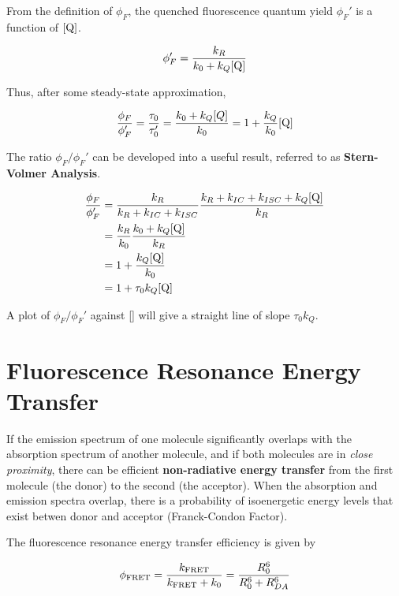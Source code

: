 \documentclass[a4paper]{tufte-handout}
\theoremstyle{definition}
\begin{document}
From the definition of $\phi_F$, the quenched fluorescence quantum yield $\phi_F'$ is a function of $[\ce{Q}]$.

\begin{equation}
  \phi_F' = \frac{k_R}{k_0 + k_Q[\ce{Q}]}
\end{equation}

Thus, after some steady-state approximation,

\begin{equation}
  \frac{\phi_{F}}{\phi_{F}'} = \frac{\tau_0}{\tau_0'} = \frac{k_0 + k_Q[Q]}{k_0} = 1 + \frac{k_Q}{k_0}[\ce{Q}]
\end{equation}

The ratio $\phi_F / \phi_F'$ can be developed into a useful result, referred to as \textbf{Stern-Volmer Analysis}.

\begin{align*}
  \frac{\phi_F}{\phi_F'} &= \frac{k_R}{k_R + k_{IC} + k_{ISC}} \frac{k_R + k_{IC} + k_{ISC} + k_Q[\ce{Q}]}{k_R} \\
  &= \frac{k_R}{k_0} \frac{k_0 + k_Q[\ce{Q}]}{k_R} \\
  &= 1 + \frac{k_Q[\ce{Q}]}{k_0} \\
  &= 1 + \tau_0 k_Q[\ce{Q}]
\end{align*}

A plot of $\phi_F/\phi_F'$ against [] will give a straight line of slope $\tau_0 k_Q$.

\section{Fluorescence Resonance Energy Transfer}

If the emission spectrum of one molecule significantly overlaps with the absorption spectrum of another molecule,
and
if both molecules are in \textit{close proximity}, there can be efficient \textbf{non-radiative energy transfer} from the first molecule
(the donor) to the second (the acceptor). When the absorption and emission spectra overlap, there is a probability of isoenergetic energy 
levels that exist betwen donor and acceptor
(Franck-Condon Factor).

The fluorescence resonance energy transfer efficiency is given by

\begin{equation}
  \phi_{\ce{FRET}} = \frac{k_{\ce{FRET}}}{k_{\ce{FRET}}+k_0} = \frac{R_0^6}{R_0^6+R_{DA}^6}
\end{equation}
\end{document}
